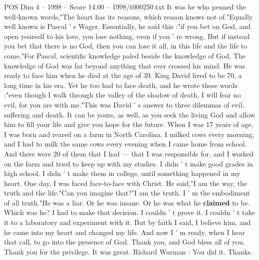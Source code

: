 \begin{textsample}{POS Dim 4 – 1998 – Score 14.00 – 1998/t000250.txt}
It was he who penned the well-known words,"The heart has its reasons, which reason knows not of."Equally well known is Pascal ' s Wager.
Essentially, he said this :"if you bet on God, and open yourself to his love, you lose nothing, even if you ' re wrong.
But if instead you bet that there is no God, then you can lose it all, in this life and the life to come."For Pascal, scientific knowledge paled beside the knowledge of God.
The knowledge of God was far beyond anything that ever crossed his mind.
He was ready to face him when he died at the age of 39.
King David lived to be 70, a long time in his era.
Yet he too had to face death, and he wrote these words :"even though I walk through the valley of the shadow of death, I will fear no evil, for you are with me."This was David ' s answer to three dilemmas of evil, suffering and death.
It can be yours, as well, as you seek the living God and allow him to fill your life and give you hope for the future.
When I was 17 years of age, I was born and reared on a farm in North Carolina.
I milked cows every morning, and I had to milk the same cows every evening when I came home from school.
And there were 20 of them that I had — that I was responsible for, and I worked on the farm and tried to keep up with my studies.
I didn ' t make good grades in high school.
I didn ' t make them in college, until something happened in my heart.
One day, I was faced face-to-face with Christ.
He said,"I am the way, the truth and the life."Can you imagine that?"I am the truth.
I ' m the embodiment of all truth."He was a liar.
Or he was insane.
Or he was what he \textbf{claimed} to be.
Which was he?
I had to make that decision.
I couldn ' t prove it.
I couldn ' t take it to a laboratory and experiment with it.
But by faith I said, I believe him, and he came into my heart and changed my life.
And now I ' m ready, when I hear that call, to go into the presence of God.
Thank you, and God bless all of you.
Thank you for the privilege.
It was great.
Richard Wurman : You did it.
Thanks.

\end{textsample}
